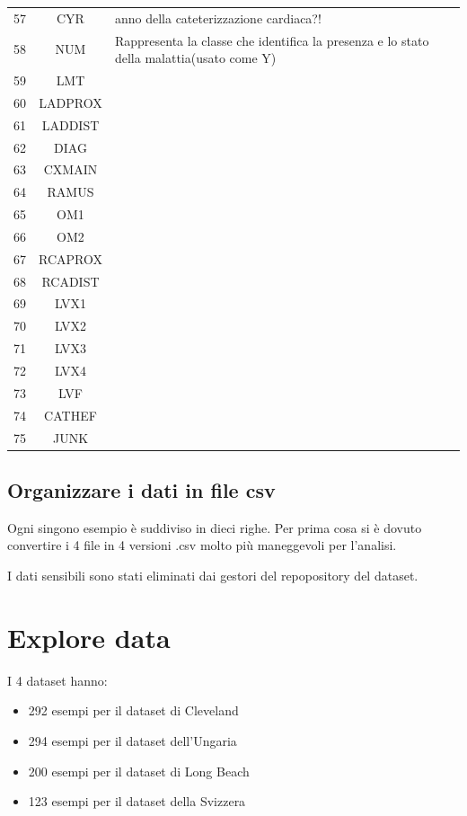 \documentclass[a4paper]{article}
\begin{document}
\begin{center}
{\begin{tabular}{| p{20mm} | c | p{100mm} |}
            57 & CYR & anno della cateterizzazione cardiaca?! \\
            58 & NUM & Rappresenta la classe che identifica la presenza e lo stato della malattia(usato come Y) \\
            59 & LMT &  \\
            60 & LADPROX & \\
            61 & LADDIST & \\
            62 & DIAG & \\
            63 & CXMAIN & \\
            64 & RAMUS & \\
            65 & OM1 & \\
            66 & OM2 & \\
            67 & RCAPROX & \\
            68 & RCADIST & \\
            69 & LVX1 & \\
            70 & LVX2 & \\
            71 & LVX3 & \\
            72 & LVX4 & \\
            73 & LVF & \\
            74 & CATHEF & \\
            75 & JUNK & \\
            \hline
        \end{tabular}
    }
    \end{center}
        
    


    \subsection{Organizzare i dati in file csv}
    Ogni singono esempio è suddiviso in dieci righe.
    Per prima cosa si è dovuto convertire i 4 file in 4 versioni .csv molto più maneggevoli per l'analisi.

    
    I dati sensibili sono stati eliminati dai gestori del repopository del dataset.

    \section{Explore data}

    I 4 dataset hanno:
    \begin{itemize}
        \item 292 esempi per il dataset di Cleveland
        \item 294 esempi per il dataset dell'Ungaria
        \item 200 esempi per il dataset di Long Beach
        \item 123 esempi per il dataset della Svizzera
    \end{itemize}
\end{document}
